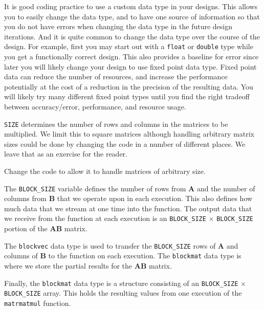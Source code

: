 \begin{aside}
It is good coding practice to use a custom data type in your designs. This allows you to easily change the data type, and to have one source of information so that you do not have errors when changing the data type in the future design iterations. And it is quite common to change the data type over the course of the design. For example, first you may start out with a \lstinline{float} or \lstinline{double} type while you get a functionally correct design. This also provides a baseline for error since later you will likely change your design to use fixed point data type.  Fixed point data can reduce the number of resources, and increase the performance potentially at the cost of a reduction in the precision of the resulting data. You will likely try many different fixed point types until you find the right tradeoff between accuracy/error, performance, and resource usage.
\end{aside}

\lstinline{SIZE} determines the number of rows and columns in the matrices to be multiplied. We limit this to square matrices although handling arbitrary matrix sizes could be done by changing the code in a number of different places. We leave that as an exercise for the reader.

\begin{exercise}
Change the code to allow it to handle matrices of arbitrary size. 
\end{exercise}

The \lstinline{BLOCK_SIZE} variable defines the number of rows from $\mathbf{A}$ and the number of columns from $\mathbf{B}$ that we operate upon in each execution. This also defines how much data that we stream at one time into the function. The output data that we receive from the function at each execution is an \lstinline{BLOCK_SIZE} $\times$ \lstinline{BLOCK_SIZE} portion of the $\mathbf{AB}$ matrix. 

The \lstinline{blockvec} data type is used to transfer the \lstinline{BLOCK_SIZE} rows of $\mathbf{A}$ and columns of $\mathbf{B}$ to the function on each execution. The \lstinline{blockmat} data type is where we store the partial results for the $\mathbf{AB}$ matrix. 

Finally, the \lstinline{blockmat} data type is a structure consisting of an \lstinline{BLOCK_SIZE} $\times$ \lstinline{BLOCK_SIZE} array. This holds the resulting values from one execution of the \lstinline{matrmatmul} function. 

